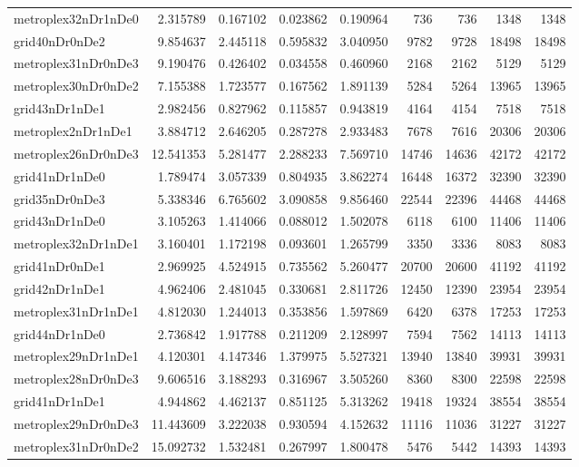 \begin{longtable}{|l|r|r|r|r|r|r|r|r|}
metroplex32nDr1nDe0 & 2.315789 & 0.167102 & 0.023862 & 0.190964 & 736 & 736 & 1348 & 1348 \\
grid40nDr0nDe2 & 9.854637 & 2.445118 & 0.595832 & 3.040950 & 9782 & 9728 & 18498 & 18498 \\
metroplex31nDr0nDe3 & 9.190476 & 0.426402 & 0.034558 & 0.460960 & 2168 & 2162 & 5129 & 5129 \\
metroplex30nDr0nDe2 & 7.155388 & 1.723577 & 0.167562 & 1.891139 & 5284 & 5264 & 13965 & 13965 \\
grid43nDr1nDe1 & 2.982456 & 0.827962 & 0.115857 & 0.943819 & 4164 & 4154 & 7518 & 7518 \\
metroplex2nDr1nDe1 & 3.884712 & 2.646205 & 0.287278 & 2.933483 & 7678 & 7616 & 20306 & 20306 \\
metroplex26nDr0nDe3 & 12.541353 & 5.281477 & 2.288233 & 7.569710 & 14746 & 14636 & 42172 & 42172 \\
grid41nDr1nDe0 & 1.789474 & 3.057339 & 0.804935 & 3.862274 & 16448 & 16372 & 32390 & 32390 \\
grid35nDr0nDe3 & 5.338346 & 6.765602 & 3.090858 & 9.856460 & 22544 & 22396 & 44468 & 44468 \\
grid43nDr1nDe0 & 3.105263 & 1.414066 & 0.088012 & 1.502078 & 6118 & 6100 & 11406 & 11406 \\
metroplex32nDr1nDe1 & 3.160401 & 1.172198 & 0.093601 & 1.265799 & 3350 & 3336 & 8083 & 8083 \\
grid41nDr0nDe1 & 2.969925 & 4.524915 & 0.735562 & 5.260477 & 20700 & 20600 & 41192 & 41192 \\
grid42nDr1nDe1 & 4.962406 & 2.481045 & 0.330681 & 2.811726 & 12450 & 12390 & 23954 & 23954 \\
metroplex31nDr1nDe1 & 4.812030 & 1.244013 & 0.353856 & 1.597869 & 6420 & 6378 & 17253 & 17253 \\
grid44nDr1nDe0 & 2.736842 & 1.917788 & 0.211209 & 2.128997 & 7594 & 7562 & 14113 & 14113 \\
metroplex29nDr1nDe1 & 4.120301 & 4.147346 & 1.379975 & 5.527321 & 13940 & 13840 & 39931 & 39931 \\
metroplex28nDr0nDe3 & 9.606516 & 3.188293 & 0.316967 & 3.505260 & 8360 & 8300 & 22598 & 22598 \\
grid41nDr1nDe1 & 4.944862 & 4.462137 & 0.851125 & 5.313262 & 19418 & 19324 & 38554 & 38554 \\
metroplex29nDr0nDe3 & 11.443609 & 3.222038 & 0.930594 & 4.152632 & 11116 & 11036 & 31227 & 31227 \\
metroplex31nDr0nDe2 & 15.092732 & 1.532481 & 0.267997 & 1.800478 & 5476 & 5442 & 14393 & 14393 \\

\end{longtable}
